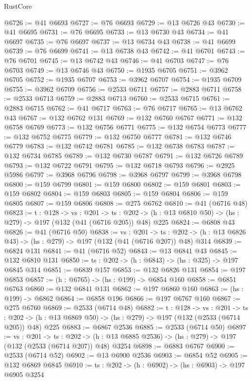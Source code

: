 \begin{lexlean}{RustCore}
\begin{coremodule}
@6726 := @41 @6693
@6727 := @76 @6693
@6729 := @13 @6726 @43
@6730 := @41 @6695
@6731 := @76 @6695
@6733 := @13 @6730 @43
@6734 := @41 @6697
@6735 := @76 @6697
@6737 := @13 @6734 @43
@6738 := @41 @6699
@6739 := @76 @6699
@6741 := @13 @6738 @43
@6742 := @41 @6701
@6743 := @76 @6701
@6745 := @13 @6742 @43
@6746 := @41 @6703
@6747 := @76 @6703
@6749 := @13 @6746 @43
@6750 := @1935 @6705
@6751 := @3962 @6705
@6752 := @1935 @6707
@6753 := @3962 @6707
@6754 := @1935 @6709
@6755 := @3962 @6709
@6756 := @2533 @6711
@6757 := @2883 @6711
@6758 := @2533 @6713
@6759 := @2883 @6713
@6760 := @2533 @6715
@6761 := @2883 @6715
@6762 := @41 @6717
@6763 := @76 @6717
@6765 := @13 @6762 @43
@6767 := @132 @6762 @131
@6769 := @132 @6760 @6767
@6771 := @132 @6758 @6769
@6773 := @132 @6756 @6771
@6775 := @132 @6754 @6773
@6777 := @132 @6752 @6775
@6779 := @132 @6750 @6777
@6781 := @132 @6746 @6779
@6783 := @132 @6742 @6781
@6785 := @132 @6738 @6783
@6787 := @132 @6734 @6785
@6789 := @132 @6730 @6787
@6791 := @132 @6726 @6789
@6793 := @132 @6722 @6791
@6795 := @132 @6718 @6793
@6796 := @2925 @5986
@6797 := @3968 @6796
@6798 := @3968 @6797
@6799 := @3968 @6798
@6800 := @159 @6799
@6801 := @159 @6800
@6802 := @159 @6801
@6803 := @159 @6802
@6804 := @159 @6803
@6805 := @159 @6804
@6806 := @159 @6805
@6807 := @159 @6806
@6808 := @275 @6762
@6810 := @41 (@6716 @48)
@6823 := {t : @128} ->
  {vs : @201} ->
  {ts : @202} -> (h : @13 @6810 @50) -> (hs : @279) -> @197 (@132 (@41 (@6716 @205)) @48) @225
@6824 := @6808 @43
@6826 := @41 (@6716 @50)
@6838 := {vs : @201} ->
  {ts : @202} -> (h : @13 @6826 @43) -> (hs : @279) -> @197 (@132 (@41 (@6716 @207)) @48) @314
@6839 := @6824 @131
@6841 := @41 (@6716 @52)
@6843 := @13 @6841 @43
@6845 := @132 @6810 @131
@6850 := {ts : @202} -> (h : @6843) -> (hs : @325) -> @197 @6845 @314
@6851 := @6839 @157
@6853 := @132 @6826 @131
@6854 := @197 @6853
@6857 := (h : @6765) -> (hs : @199) -> @6854 @160
@6858 := @6851 @6763
@6860 := @132 @6841 @131
@6862 := @197 @6860 @160
@6863 := (hs : @199) -> @6862
@6864 := @6858 @196
@6866 := @197 @6767 @160
@6867 := @275 @6760
@6869 := @2533 (@6714 @48)
@6882 := {t : @128} ->
  {vs : @201} ->
  {ts : @202} -> (h : @13 @6869 @50) -> (hs : @279) -> @197 (@132 (@2533 (@6714 @205)) @48) @225
@6883 := @6867 @2536
@6885 := @2533 (@6714 @50)
@6897 := {vs : @201} ->
  {ts : @202} -> (h : @13 @6885 @2536) -> (hs : @279) -> @197 (@132 (@2533 (@6714 @207)) @48) @3254
@6898 := @6883 @6767
@6900 := @2533 (@6714 @52)
@6902 := @13 @6900 @2536
@6903 := @6854 @52
@6905 := @132 @6869 @6845
@6910 := {ts : @202} -> (h : @6902) -> (hs : @6903) -> @197 @6905 @3254

\end{coremodule}
\end{lexlean}
